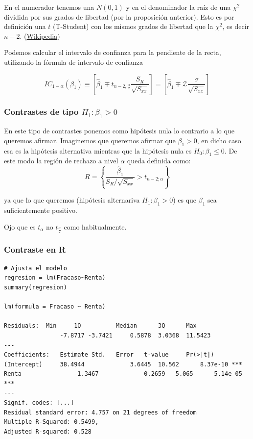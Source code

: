 En el numerador tenemos una $N(0,1)$ y en el denominador la raíz de una $\chi^2$ dividida por sus grados de libertad (por la proposición anterior). Esto es por definición una $t$ (T-Student) con los mismos grados de libertad que la $\chi^2$, es decir $n-2$. (\href{https://en.wikipedia.org/wiki/Student%27s\_t-distribution#Characterization}{Wikipedia})


\begin{prop}
Podemos calcular el intervalo de confianza  para la pendiente de la recta, utilizando la fórmula de intervalo de confianza

\[
IC_{1-α}(β_1) \equiv \left[ \hat{β}_1 \mp t_{n-2,\frac{α}{2}}\frac{S_R}{\sqrt{S_{xx}}}\right] = \left[ \hat{β}_1 \mp \mathcal{Z}\frac{σ}{\sqrt{S_{xx}}}\right] %
\]
\end{prop}

\subsubsection{Contrastes de tipo $H_1: β_1>0$}
\label{subsubsec:contrastes_mayor_que}
En este tipo de contrastes ponemos como hipótesis nula lo contrario a lo que queremos afirmar. Imaginemos que queremos afirmar que $β_1>0$, en dicho caso esa es la hipótesis alternativa mientras que la hipótesis nula es $H_0: β_1≤0$. De este modo la región de rechazo a nivel $α$ queda definida como:
\[R = \left\{ \frac{\hat{β}_1}{S_R/\sqrt{S_{xx}}} > t_{n-2;α} \right\}\]

ya que lo que queremos (hipótesis alternariva $H_1: β_1>0$) es que $β_1$ sea suficientemente positivo.

\obs Ojo que es $t_α$ no $t_{\frac{α}{2}}$ como habitualmente.

\subsubsection{Contraste en R}

\label{example:R-output}
\begin{lstlisting}[style=mystyle]
# Ajusta el modelo
regresion = lm(Fracaso~Renta)
summary(regresion)

lm(formula = Fracaso ~ Renta)

Residuals:	Min		1Q			Median		3Q		Max
				-7.8717 -3.7421		0.5878	3.0368	11.5423
---
Coefficients:	Estimate Std.	Error 	t-value		Pr(>|t|)
(Intercept)		38.4944				3.6445	10.562		8.37e-10 ***
Renta 				-1.3467				0.2659	-5.065		5.14e-05 ***
---
Signif. codes: [...]
Residual standard error: 4.757 on 21 degrees of freedom
Multiple R-Squared: 0.5499,
Adjusted R-squared: 0.528
\end{lstlisting}


